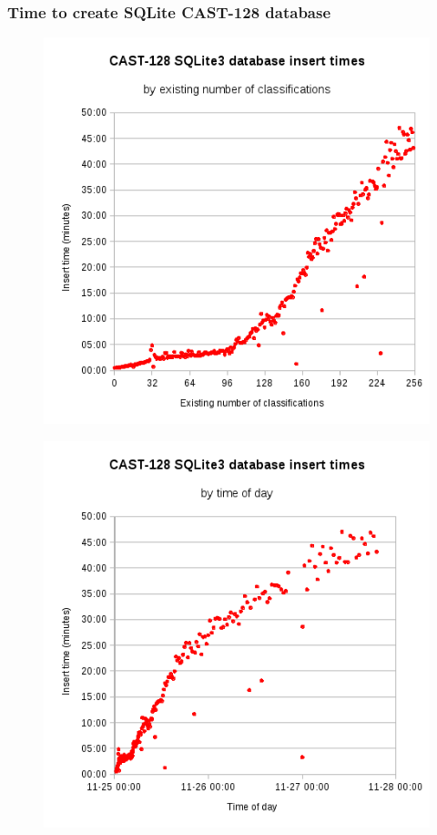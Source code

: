 \documentclass[pdf,sprung,slideColor,nocolorBG]{beamer}
\newenvironment{colortheme}[1]{
\def\ProvidesPackageRCS $##1${\relax}
\renewcommand{\ProcessOptions}{\relax}
\makeatletter

\makeatother
}{}
\begin{document}
\begin{colortheme}{jubata}
\begin{frame}
\frametitle{Time to create SQLite CAST-128 database}
\begin{figure}
\centering
\begin{minipage}{.49\textwidth}
  \centering
  \includegraphics[width=1.0\linewidth]{CAST128-database-insert-times-by-existing.png}
  \label{fig:CAST128_database_insert_times_by_existing}
\end{minipage}
\begin{minipage}{.49\textwidth}
  \centering
  \includegraphics[width=1.0\linewidth]{CAST128-database-insert-times-by-time-of-day.png}

\end{minipage}
\end{figure}
\end{frame}
\end{colortheme}
\end{document}
